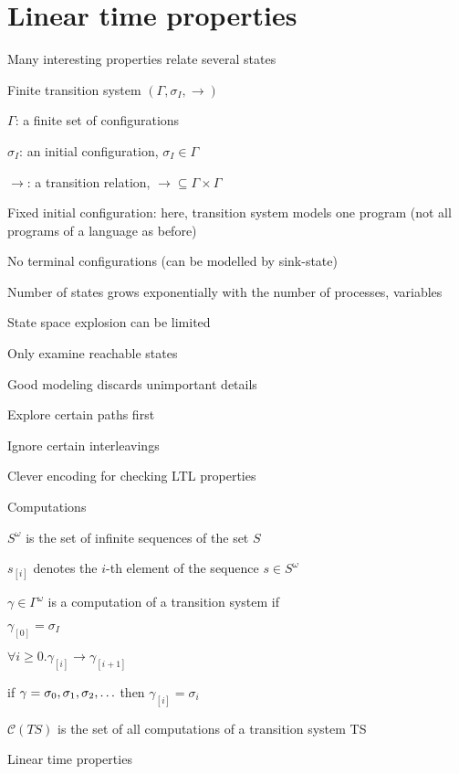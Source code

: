 \section{Linear time properties}
\enumstart
	\item Many interesting properties relate several states
	\item Finite transition system $(\Gamma, \sigma_I, \rightarrow)$
	\enumstart
		\item $\Gamma$: a finite set of configurations
		\item $\sigma_I$: an initial configuration, $\sigma_I \in \Gamma$
		\item $\rightarrow$: a transition relation, $\rightarrow \subseteq \Gamma \times \Gamma$
		\item Fixed initial configuration: here, transition system models one program (not all programs of a language as before)
		\item No terminal configurations (can be modelled by sink-state)
		\item Number of states grows exponentially with the number of processes, variables
		\item State space explosion can be limited
		\enumstart
			\item Only examine reachable states
			\item Good modeling discards unimportant details
			\item Explore certain paths first
			\item Ignore certain interleavings
			\item Clever encoding for checking LTL properties
		\enumend
	\enumend
	\item Computations
	\enumstart
		\item $S^\omega$ is the set of infinite sequences of the set $S$
		\item $s_{[i]}$ denotes the $i$-th element of the sequence $s \in S^\omega$
		\item $\gamma \in \Gamma^\omega$ is a computation of a transition system if
		\enumstart
			\item $\gamma_{[0]} = \sigma_I$
			\item $\forall i \ge 0.\gamma_{[i]} \rightarrow \gamma_{[i+1]}$
			\item if $\gamma = \sigma_0, \sigma_1, \sigma_2,\mathellipsis$ then $\gamma_{[i]} = \sigma_i$
		\enumend
		\item $\mathcal{C}(TS)$ is the set of all computations of a transition system TS
	\enumend
	\item Linear time properties
